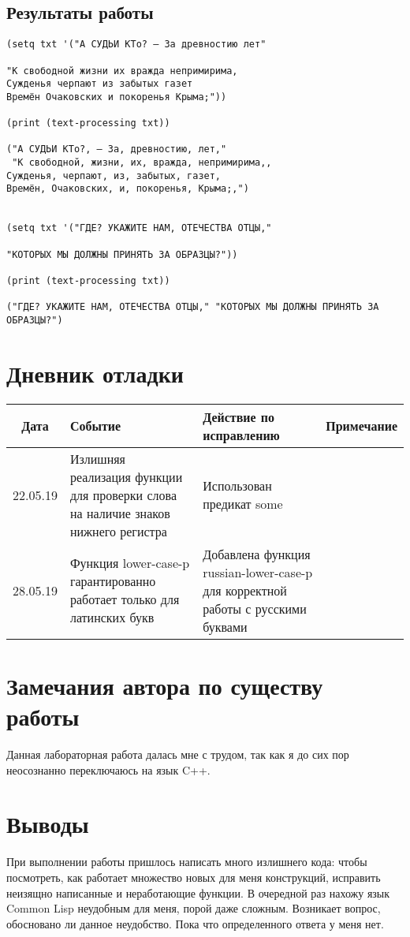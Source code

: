 \documentclass[12pt]{article}
\begin{document}
\subsection{Результаты работы}
\begin{lstlisting}
(setq txt '("А СУДЬИ КТо? – За древностию лет"

"К свободной жизни их вражда непримирима,
Сужденья черпают из забытых газет
Времён Очаковских и покоренья Крыма;"))

(print (text-processing txt))

("А СУДЬИ КТо?, – За, древностию, лет,"
 "К свободной, жизни, их, вражда, непримирима,,
Сужденья, черпают, из, забытых, газет,
Времён, Очаковских, и, покоренья, Крыма;,") 


(setq txt '("ГДЕ? УКАЖИТЕ НАМ, ОТЕЧЕСТВА ОТЦЫ,"

"КОТОРЫХ МЫ ДОЛЖНЫ ПРИНЯТЬ ЗА ОБРАЗЦЫ?"))

(print (text-processing txt))

("ГДЕ? УКАЖИТЕ НАМ, ОТЕЧЕСТВА ОТЦЫ," "КОТОРЫХ МЫ ДОЛЖНЫ ПРИНЯТЬ ЗА ОБРАЗЦЫ?") 
\end{lstlisting}

\section{Дневник отладки}
\begin{tabular}{|c|p{5cm}|p{5cm}|p{3cm}|}
\hline
Дата & Событие & Действие по исправлению & Примечание \\
\hline
22.05.19 & Излишняя реализация функции для проверки слова на наличие знаков нижнего регистра & Использован предикат some & \\
\hline
28.05.19 & Функция lower-case-p гарантированно работает только для
латинских букв & Добавлена функция russian-lower-case-p для корректной работы с русскими буквами & \\
\hline
\end{tabular}

\section{Замечания автора по существу работы}
Данная лабораторная работа далась мне с трудом, так как я до сих пор неосознанно переключаюсь на язык C++.

\section{Выводы}
При выполнении работы пришлось написать много излишнего кода: чтобы посмотреть, как работает множество новых для меня конструкций, исправить неизящно написанные и неработающие функции. В очередной раз нахожу язык Common Lisp неудобным для меня, порой даже сложным. Возникает вопрос, обосновано ли данное неудобство. Пока что определенного ответа у меня нет.
\end{document}
